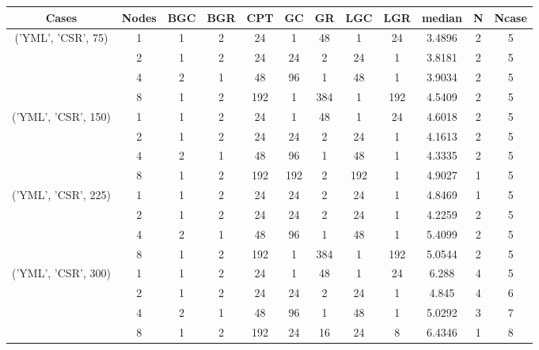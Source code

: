 \begin{tabular}{cccccccccccc}
\hline
Cases & Nodes& BGC& BGR& CPT& GC& GR& LGC& LGR& median & N & Ncase \\
\hline
\multirow{4}{*}{('YML', 'CSR', 75)}& 1& 1& 2& 24& 1& 48& 1& 24& 3.4896& 2& 5\\
& 2& 1& 2& 24& 24& 2& 24& 1& 3.8181& 2& 5\\
& 4& 2& 1& 48& 96& 1& 48& 1& 3.9034& 2& 5\\
& 8& 1& 2& 192& 1& 384& 1& 192& 4.5409& 2& 5\\
\hline
\multirow{4}{*}{('YML', 'CSR', 150)}& 1& 1& 2& 24& 1& 48& 1& 24& 4.6018& 2& 5\\
& 2& 1& 2& 24& 24& 2& 24& 1& 4.1613& 2& 5\\
& 4& 2& 1& 48& 96& 1& 48& 1& 4.3335& 2& 5\\
& 8& 1& 2& 192& 192& 2& 192& 1& 4.9027& 1& 5\\
\hline
\multirow{4}{*}{('YML', 'CSR', 225)}& 1& 1& 2& 24& 24& 2& 24& 1& 4.8469& 1& 5\\
& 2& 1& 2& 24& 24& 2& 24& 1& 4.2259& 2& 5\\
& 4& 2& 1& 48& 96& 1& 48& 1& 5.4099& 2& 5\\
& 8& 1& 2& 192& 1& 384& 1& 192& 5.0544& 2& 5\\
\hline
\multirow{4}{*}{('YML', 'CSR', 300)}& 1& 1& 2& 24& 1& 48& 1& 24& 6.288& 4& 5\\
& 2& 1& 2& 24& 24& 2& 24& 1& 4.845& 4& 6\\
& 4& 2& 1& 48& 96& 1& 48& 1& 5.0292& 3& 7\\
& 8& 1& 2& 192& 24& 16& 24& 8& 6.4346& 1& 8\\
\hline
\end{tabular}



